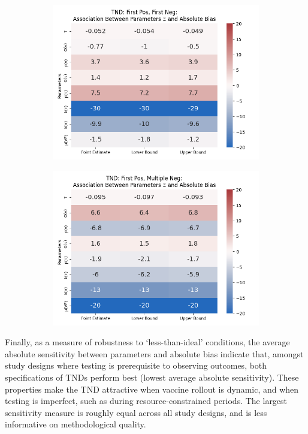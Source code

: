 \documentclass[12pt]{article}
\begin{document}
\begin{figure}[H]
	\begin{subfigure}[t]{0.23\linewidth}
		\centering
		\caption{}
		\includegraphics[scale=0.25]{VEMethod_Drivers1b_FEest_Li_MSpec_Heatmap9.png}
	\end{subfigure}
	\begin{subfigure}[t]{0.23\linewidth}
		\centering
		\caption{}
		\includegraphics[scale=0.25]{VEMethod_Drivers1b_FEest_Li_MSpec_Heatmap10.png}
	\end{subfigure}
\end{figure}

Finally, as a measure of robustness to `less-than-ideal' conditions, the average absolute sensitivity between parameters and absolute bias indicate that, amongst study designs where testing is prerequisite to observing outcomes, both specifications of TNDs perform best (lowest average absolute sensitivity). These properties make the TND attractive when vaccine rollout is dynamic, and when testing is imperfect, such as during resource-constrained periods. The largest sensitivity measure is roughly equal across all study designs, and is less informative on methodological quality.
\end{document}
